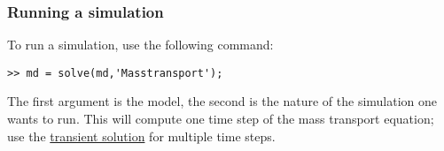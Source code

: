 \subsubsection{Running a simulation}
To run a simulation, use the following command:
\begin{lstlisting}
>> md = solve(md,'Masstransport');
\end{lstlisting}
The first argument is the model, the second is the nature of the simulation one wants to run. This will compute one time step of the mass transport equation; use the 
\hyperref[sec:using-issm-capabilities-transient]{transient solution}
for multiple time steps.

\clearpage %
